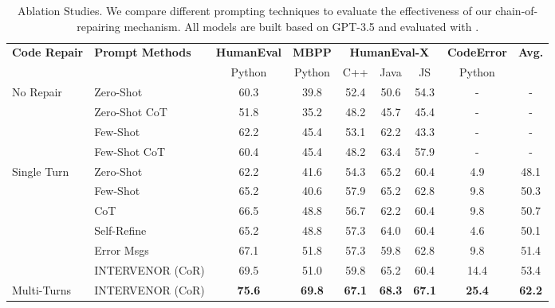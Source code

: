 \documentclass[11pt]{article}
\begin{document}
\begin{table*}[]
\centering
\small
\caption{Ablation Studies. We compare different prompting techniques to evaluate the effectiveness of our chain-of-repairing mechanism. All models are built based on GPT-3.5 and evaluated with .}
\label{tab:prompt_tec}
\begin{tabular}{l|l|c|c|ccc|c|c}
\hline
\multirow{2}{*}{\textbf{Code Repair}} & \multirow{2}{*}{\textbf{Prompt Methods}} & \textbf{HumanEval} & \textbf{MBPP} & \multicolumn{3}{c|}{\textbf{HumanEval-X}} & \multicolumn{1}{l|}{\textbf{CodeError}} & \multirow{2}{*}{\textbf{Avg.}} \\
                          &       & Python             & Python        & C++        & Java       & JS      & Python                                  &                                   \\ \hline
\multirow{4}{*}{No Repair} & Zero-Shot            & 60.3               & 39.8          & 52.4       & 50.6       & 54.3            & -                                    & -                            \\
& Zero-Shot CoT          & 51.8               & 35.2          & 48.2       & 45.7       & 45.4            & -                                     & -                                 \\
&Few-Shot               & 62.2               & 45.4          & 53.1       & 62.2       & 43.3            & -                                     & -                             \\
& Few-Shot CoT                    & 60.4               & 45.4          & 48.2       & 63.4       & 57.9            & -                                     & -                              \\ \hline
\multirow{6}{*}{Single Turn} & Zero-Shot &62.2&41.6&54.3&65.2&60.4&4.9&48.1\\
 & Few-Shot &65.2&40.6&57.9&65.2&62.8&9.8&50.3\\
& CoT &66.5&48.8&56.7&62.2&60.4&9.8&50.7\\


& Self-Refine       & 65.2                  & 48.8             & 57.3          & 64.0          & 60.4              & 4.6                                     & 50.1                                 \\
& Error Msgs        & 67.1               & 51.8          & 57.3       & 59.8       & 62.8            & 9.8                                     & 51.4                              \\
& INTERVENOR (CoR)     & 69.5                  & 51.0             & 59.8          & 65.2          & 60.4              & 14.4                                     & 53.4                                 \\\hline
Multi-Turns & INTERVENOR  (CoR)                     & \textbf{75.6}               & \textbf{69.8}          & \textbf{67.1}       & \textbf{68.3}       & \textbf{67.1}            & \textbf{25.4}                                      & \textbf{62.2}                              \\ 
\hline
\end{tabular}
\end{table*}
\end{document}
